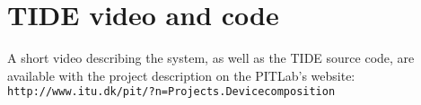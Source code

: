 \appendix
\chapter{TIDE video and code}
\label{video}

A short video describing the system, as well as the TIDE source code, are available with the project description on the PITLab's website:\\
\linebreak
\texttt{http://www.itu.dk/pit/?n=Projects.Devicecomposition}


